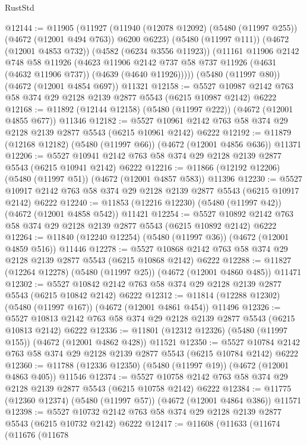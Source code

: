 \begin{lexlean}{RustStd}
\begin{coremodule}
{\begin{coremodule}
{{{{{{{{{{{{{{{{@12144 := @11905
    (@11927
      (@11940 (@12078 @12092) (@5480 (@11997 @255)) (@4672 (@12001 @494 @763)) @6200 @6223)
      (@5480 (@11997 @111))
      (@4672 (@12001 @4853 @732))
      (@4582 (@6234 @3556 @11923))
      (@11161
        @11906
        @2142
        @748
        @58
        @11926
        (@4623
          @11906
          @2142
          @737
          @58
          @737
          @11926
          (@4631 (@4632 @11906 @737))
          (@4639 (@4640 @11926)))))
    (@5480 (@11997 @80))
    (@4672 (@12001 @4854 @697))
    @11321
@12158 := @5527 @10987 @2142 @763 @58 @374 @29 @2128 @2139 @2877 @5543 (@6215 @10987 @2142) @6222
@12168 := @11892 (@12144 @12158) (@5480 (@11997 @222)) (@4672 (@12001 @4855 @677)) @11346
@12182 := @5527 @10961 @2142 @763 @58 @374 @29 @2128 @2139 @2877 @5543 (@6215 @10961 @2142) @6222
@12192 := @11879 (@12168 @12182) (@5480 (@11997 @66)) (@4672 (@12001 @4856 @636)) @11371
@12206 := @5527 @10941 @2142 @763 @58 @374 @29 @2128 @2139 @2877 @5543 (@6215 @10941 @2142) @6222
@12216 := @11866 (@12192 @12206) (@5480 (@11997 @51)) (@4672 (@12001 @4857 @583)) @11396
@12230 := @5527 @10917 @2142 @763 @58 @374 @29 @2128 @2139 @2877 @5543 (@6215 @10917 @2142) @6222
@12240 := @11853 (@12216 @12230) (@5480 (@11997 @42)) (@4672 (@12001 @4858 @542)) @11421
@12254 := @5527 @10892 @2142 @763 @58 @374 @29 @2128 @2139 @2877 @5543 (@6215 @10892 @2142) @6222
@12264 := @11840 (@12240 @12254) (@5480 (@11997 @36)) (@4672 (@12001 @4859 @516)) @11446
@12278 := @5527 @10868 @2142 @763 @58 @374 @29 @2128 @2139 @2877 @5543 (@6215 @10868 @2142) @6222
@12288 := @11827 (@12264 @12278) (@5480 (@11997 @25)) (@4672 (@12001 @4860 @485)) @11471
@12302 := @5527 @10842 @2142 @763 @58 @374 @29 @2128 @2139 @2877 @5543 (@6215 @10842 @2142) @6222
@12312 := @11814 (@12288 @12302) (@5480 (@11997 @167)) (@4672 (@12001 @4861 @454)) @11496
@12326 := @5527 @10813 @2142 @763 @58 @374 @29 @2128 @2139 @2877 @5543 (@6215 @10813 @2142) @6222
@12336 := @11801 (@12312 @12326) (@5480 (@11997 @155)) (@4672 (@12001 @4862 @428)) @11521
@12350 := @5527 @10784 @2142 @763 @58 @374 @29 @2128 @2139 @2877 @5543 (@6215 @10784 @2142) @6222
@12360 := @11788 (@12336 @12350) (@5480 (@11997 @19)) (@4672 (@12001 @4863 @405)) @11546
@12374 := @5527 @10758 @2142 @763 @58 @374 @29 @2128 @2139 @2877 @5543 (@6215 @10758 @2142) @6222
@12384 := @11775 (@12360 @12374) (@5480 (@11997 @57)) (@4672 (@12001 @4864 @386)) @11571
@12398 := @5527 @10732 @2142 @763 @58 @374 @29 @2128 @2139 @2877 @5543 (@6215 @10732 @2142) @6222
@12417 := @11608
    (@11633
      (@11674
        (@11676
          (@11678
}}}}}}}}}}}}}}}}
\end{coremodule}}
\end{coremodule}
\end{lexlean}
